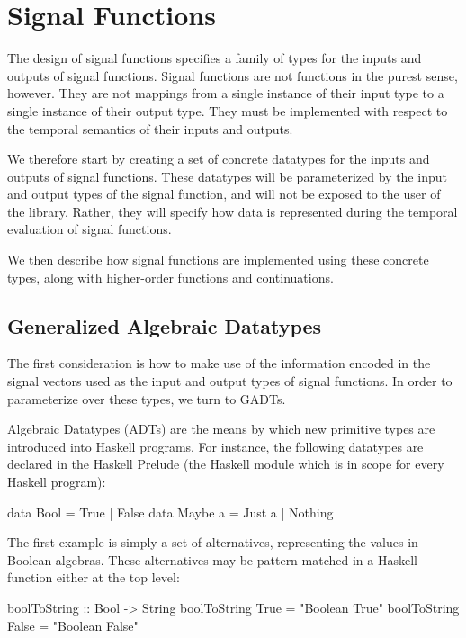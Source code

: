 \section{Signal Functions}
\label{section:Implementation-Signal_Functions}

The design of signal functions specifies a family of types for the inputs and
outputs of signal functions. Signal functions are not functions in the purest
sense, however. They are not mappings from a single instance of their input
type to a single instance of their output type. They must be implemented with
respect to the temporal semantics of their inputs and outputs.

We therefore start by creating a set of concrete datatypes for the inputs and
outputs of signal functions. These datatypes will be parameterized by the input
and output types of the signal function, and will not be exposed to the user of
the library. Rather, they will specify how data is represented during the
temporal evaluation of signal functions.

We then describe how signal functions are implemented using these concrete
types, along with higher-order functions and continuations.

\subsection{Generalized Algebraic Datatypes}
\label{subsection:Implementation-Signal_Functions-Generalized_Algebraic_Datatypes}
The first consideration is how to make use of the information encoded in the
signal vectors used as the input and output types of signal functions. In order
to parameterize over these types, we turn to GADTs.

Algebraic Datatypes (ADTs) are the means by which new primitive types are
introduced into Haskell programs. For instance, the following datatypes are
declared in the Haskell Prelude (the Haskell module which is in scope for every
Haskell program):

\begin{code}
data Bool    = True   | False
data Maybe a = Just a | Nothing
\end{code}

The first example is simply a set of alternatives, representing the values in
Boolean algebras. These alternatives may be pattern-matched in a Haskell
function either at the top level:

\begin{code}
boolToString :: Bool -> String
boolToString True  = "Boolean True"
boolToString False = "Boolean False"
\end{code}

